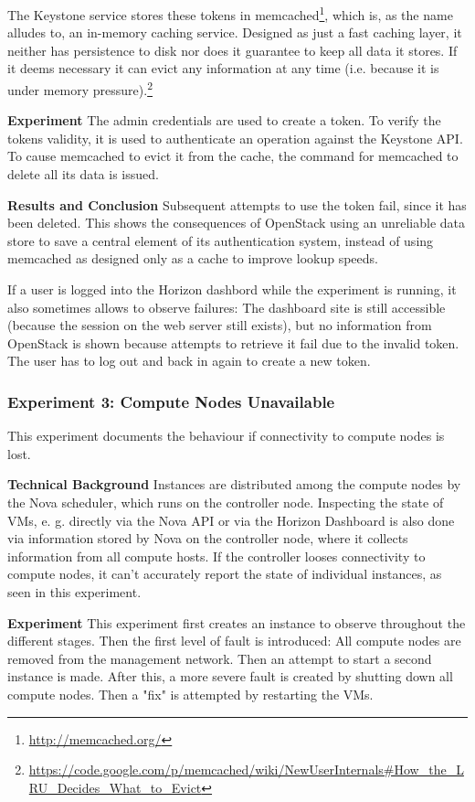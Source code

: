 \documentclass[conference]{IEEEtran}
\begin{document}
The Keystone service stores these tokens in memcached\footnote{\url{http://memcached.org/}}, which is, as the name alludes to, an in-memory caching service. Designed as just a fast caching layer, it neither has persistence to disk nor does it guarantee to keep all data it stores. If it deems necessary it can evict any information at any time (i.e. because it is under memory pressure).\footnote{\url{https://code.google.com/p/memcached/wiki/NewUserInternals\#How_the_LRU_Decides_What_to_Evict}}

\textbf{Experiment}
The admin credentials are used to create a token. To verify the tokens validity, it is used to authenticate an operation against the Keystone API. To cause memcached to evict it from the cache, the command for memcached to delete all its data is issued. 

\textbf{Results and Conclusion}
Subsequent attempts to use the token fail, since it has been deleted. This shows the consequences of OpenStack using an unreliable data store to save a central element of its authentication system, instead of using memcached as designed only as a cache to improve lookup speeds. 

If a user is  logged into the Horizon dashbord while the experiment is running, it also sometimes allows to observe failures: The dashboard site is still accessible (because the session on the web server still exists), but no information from OpenStack is shown because attempts to retrieve it fail due to the invalid token. The user has to log out and back in again to create a new token. 

\subsubsection{Experiment 3: Compute Nodes Unavailable}
This experiment documents the behaviour if connectivity to compute nodes is lost.

\textbf{Technical Background}
Instances are distributed among the compute nodes by the Nova scheduler, which runs on the controller node. Inspecting the state of VMs, e. g. directly via the Nova API or via the Horizon Dashboard is also done via information stored by Nova on the controller node, where it collects information from all compute hosts.
If the controller looses connectivity to compute nodes, it can't accurately report the state of individual instances, as seen in this experiment. 

\textbf{Experiment}
This experiment first creates an instance to observe throughout the different stages. Then the first level of fault is introduced: All compute nodes are removed from the management network. Then an attempt to start a second instance is made. After this, a more severe fault is created by shutting down all compute nodes. Then a "fix" is attempted by restarting the VMs.
\end{document}
